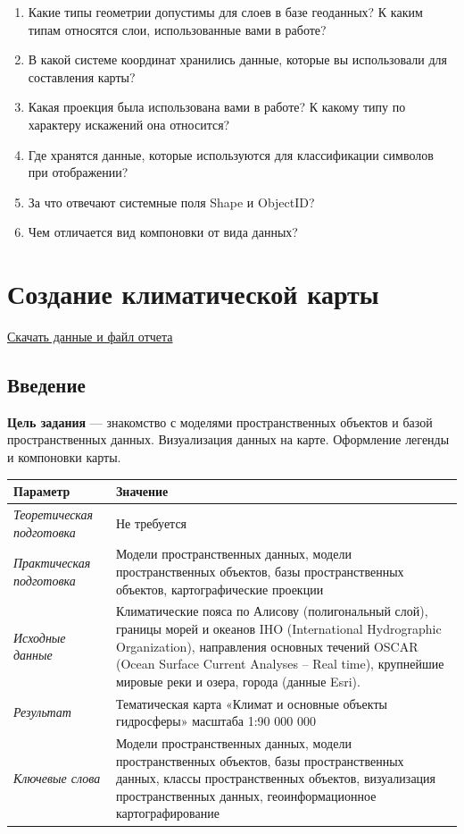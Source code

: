 \documentclass[12pt,]{book}
\begin{document}
\begin{enumerate}
\def\labelenumi{\arabic{enumi}.}
\item
  Какие типы геометрии допустимы для слоев в базе геоданных? К каким типам относятся слои, использованные вами в работе?
\item
  В какой системе координат хранились данные, которые вы использовали для составления карты?
\item
  Какая проекция была использована вами в работе? К какому типу по характеру искажений она относится?
\item
  Где хранятся данные, которые используются для классификации символов при отображении?
\item
  За что отвечают системные поля Shape и ObjectID?
\item
  Чем отличается вид компоновки от вида данных?
\end{enumerate}

\hypertarget{map-design-climates}{%
\chapter{Создание климатической карты}\label{map-design-climates}}

\href{http://autolab.geogr.msu.ru/gis/data/Ex03.zip}{Скачать данные и файл отчета}

\hypertarget{map-design-climates-intro}{%
\section{Введение}\label{map-design-climates-intro}}

\textbf{Цель задания} --- знакомство с моделями пространственных объектов и базой пространственных данных. Визуализация данных на карте. Оформление легенды и компоновки карты.

\begin{longtable}[]{@{}ll@{}}
\toprule
Параметр & Значение\tabularnewline
\midrule
\endhead
\emph{Теоретическая подготовка} & Не требуется\tabularnewline
\emph{Практическая подготовка} & Модели пространственных данных, модели пространственных объектов, базы пространственных объектов, картографические проекции\tabularnewline
\emph{Исходные данные} & Климатические пояса по Алисову (полигональный слой), границы морей и океанов IHO (International Hydrographic Organization), направления основных течений OSCAR (Ocean Surface Current Analyses -- Real time), крупнейшие мировые реки и озера, города (данные Esri).\tabularnewline
\emph{Результат} & Тематическая карта «Климат и основные объекты гидросферы» масштаба 1:90 000 000\tabularnewline
\emph{Ключевые слова} & Модели пространственных данных, модели пространственных объектов, базы пространственных данных, классы пространственных объектов, визуализация пространственных данных, геоинформационное картографирование\tabularnewline
\bottomrule
\end{longtable}
\end{document}
